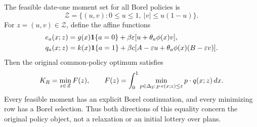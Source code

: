 \begin{theorem}\label{thm:controlled51}
The feasible date-one moment set for all Borel policies is
\begin{equation}\label{eq:lens51}
 \mathcal Z=\{(u,v):0\le u\le1,\ |v|\le u(1-u)\}.
\end{equation}
For $z=(u,v)\in\mathcal Z$, define the affine functions
\begin{align}
 e_a(x;z)&=g(x)\mathbf 1\{a=0\}+\beta\varepsilon[u+\theta_a\phi(x)v],\label{eq:row51a}\\
 q_a(x;z)&=k(x)\mathbf 1\{a=1\}+\beta c[A-\varepsilon u+\theta_a\phi(x)(B-\varepsilon v)].\label{eq:row51b}
\end{align}
Then the original common-policy optimum satisfies
\begin{equation}\label{eq:reduction51}
 K_R=\min_{z\in\mathcal Z}F(z),\qquad
 F(z)=\int_0^1\min_{p\in\Delta_2:\,p\cdot e(x;z)\le\varepsilon}p\cdot q(x;z)\,dx.
\end{equation}
Every feasible moment has an explicit Borel continuation, and every minimizing row has a Borel selection. Thus both directions of this equality concern the original policy object, not a relaxation or an initial lottery over plans.
\end{theorem}
